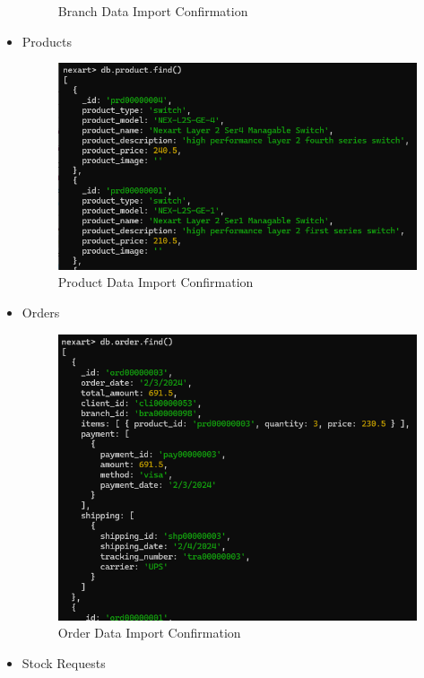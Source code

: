 \documentclass[a4Paper,12pt]{report}
\begin{document}
\begin{itemize}
\begin{figure}[H]
\caption{Branch Data Import Confirmation}
\end{figure}
\item Products
\begin{figure}[H]
\centering
\includegraphics[scale=0.4]{images/product_data_import_confirmation.png}
\caption{Product Data Import Confirmation}
\end{figure}
\item Orders
\begin{figure}[H]
\centering
\includegraphics[scale=0.4]{images/order_data_import_confirmation.png}
\caption{Order Data Import Confirmation}
\end{figure}
\item Stock Requests
\begin{figure}[H]
\centering

\end{figure}
\end{itemize}
\end{document}
